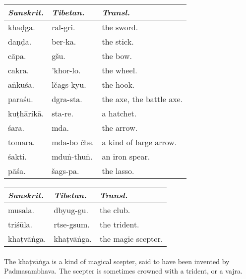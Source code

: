 \documentclass[a4paper, 12pt, oneside]{article}
\begin{document}
\begin{table}[H]
    \centering
    \small
    \begin{tabular}{l l l}
           \emph{Sanskrit.}  &  \emph{Tibetan.}  &  \emph{Transl.}           \\ \hline
        kha\d{d}ga.     &  ral-gri.     &  the sword.                \\
         da\d{n}\d{d}a.      &  ber-ka.      &  the stick.                \\
         c\={a}pa.       &  gšu.         &  the bow.                  \\
         cakra.      &  'khor-lo.    &  the wheel.                \\
         a\.{n}ku\'{s}a.     &  lčags-kyu.   &  the hook.                 \\
         para\'{s}u.     &  dgra-sta.    &  the axe, the battle axe.  \\
         ku\d{t}h\={a}rik\={a}.  &  sta-re.      &  a hatchet.                \\
         \'{s}ara.       &  mda.         &  the arrow.                \\
         tomara.     &  mda-bo čhe.  &  a kind of large arrow.    \\
         \'{s}akti.      &  mdu\.{n}-thu\.{n}.   &  an iron spear.            \\
         p\={a}\'{s}a.       &  šags-pa.     &  the lasso. \\
    \end{tabular}
\end{table}

\begin{table}[H]
    \centering
    \small
    \begin{tabular}{l l l}
   
        \emph{Sanskrit.}  &  \emph{Tibetan.}  &  \emph{Transl.}           \\ \hline
         musala.      &  dbyug-gu.   &  the club.           \\
         tri\'{s}\={u}la.     &  rtse-gsum.  &  the trident.        \\
         kha\d{t}v\={a}\.{n}ga.   &  kha\d{t}v\={a}\.{n}ga.  &  the magic scepter. \\
    \end{tabular}
\end{table}
\paragraph{}
The kha\d{t}v\={a}\.{n}ga is a kind of magical scepter, said to have been invented by Padmasambhava. The scepter is sometimes crowned with a trident, or a vajra.
\end{document}
